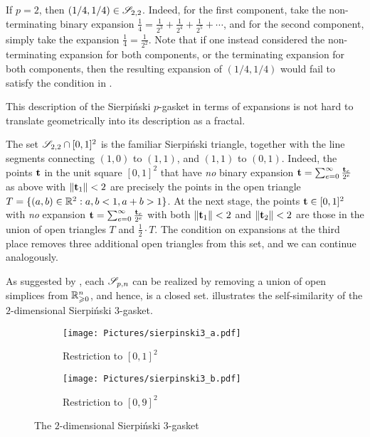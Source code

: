\documentclass[11pt]{amsart}
\begin{document}
\begin{example}
If $p=2$, then $(1/4, 1/4) \in \mathscr{S}_{2,2}$.  Indeed, for the first component, take the non-terminating binary expansion $\frac{1}{4} = \frac{1}{2^3} + \frac{1}{2^4} + \frac{1}{2^5} + \cdots$, and for the second component, simply take the expansion $\frac{1}{4} = \frac{1}{2^2}$.  Note that if one instead considered the non-terminating expansion for both components, or the terminating expansion for both components, then the resulting expansion of $(1/4, 1/4)$ would fail to satisfy the condition in .
\end{example}

This description of the Sierpi\'nski $p$-gasket in terms of expansions is not hard to translate geometrically into its description as a fractal.

\begin{example}
\label{sierpinski triangle: E}
The set $\mathscr{S}_{2,2} \cap [0,1]^2$ is the familiar Sierpi\'nski triangle, together with the line segments connecting $(1,0)$ to $(1,1)$, and $(1,1)$ to $(0,1)$.
Indeed, the points $\mathbf{t}$ in the unit square $[0,1]^2$ that have \emph{no} binary expansion $\mathbf{t} = \sum_{e=0}^{\infty}\frac{\mathbf{t}_e}{2^e}$ as above with $\| \mathbf{t}_1 \| < 2$ are precisely the points in the open triangle  $T = \{ (a,b) \in \mathbb{R}^2 : a,b < 1, a+b > 1 \}$.
At the next stage, the points $\mathbf{t} \in [0,1]^2$ with \emph{no} expansion $\mathbf{t} = \sum_{e=0}^{\infty}\frac{\mathbf{t}_e}{2^e}$ with both  $\| \mathbf{t}_1 \| < 2$ and $\| \mathbf{t}_2 \| < 2$ are those in the union of open triangles $T$ and $\frac{1}{2} \cdot T$.  The condition on expansions at the third place removes three additional open triangles from this set, and we can continue analogously.
\end{example}


As suggested by , each $\mathscr{S}_{p,n}$  can be realized by removing a union of open simplices from $\mathbb{R}_{\geqslant 0}^n$, and hence, is a closed set.  
 illustrates the self-similarity of the $2$-dimensional Sierpi\'nski $3$-gasket.

\begin{figure}
\begin{subfigure}{.49\textwidth}
  \centering
  \texttt{[image: Pictures/sierpinski3\_a.pdf]}
  \caption{Restriction to $[0,1]^2$}
\end{subfigure}
\begin{subfigure}{.49\textwidth}
  \centering
  \texttt{[image: Pictures/sierpinski3\_b.pdf]}
  \caption{Restriction to $[0,9]^2$}
\end{subfigure}
\caption{The $2$-dimensional Sierpi\'nski 3-gasket}
\label{fig: sierpinski 3-gasket}
\end{figure}
\end{document}

